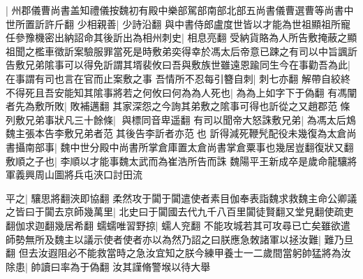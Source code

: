 |{
	州郡儀曹尚書盖知禮儀按魏初有殿中樂部駕部南部北部五尚書儀曹選曹等尚書中世所置訢許斤翻}
少相親善|{
	少詩沿翻}
與中書侍郎盧度世皆以才能為世祖顯祖所寵任參豫機密出納詔命其後訢出為相州刺史|{
	相息亮翻}
受納貨賂為人所告敷掩蔽之顯祖聞之檻車徵訢案驗服罪當死是時敷弟奕得幸於馮太后帝意已踈之有司以中旨諷訢告敷兄弟隂事可以得免訢謂其壻裴攸曰吾與敷族世雖遠恩踰同生今在事勸吾為此|{
	在事謂有司也言在官而止案敷之事}
吾情所不忍每引簪自刺|{
	刺七亦翻}
解帶自絞終不得死且吾安能知其隂事將若之何攸曰何為為人死也|{
	為為上如字下于偽翻}
有馮闡者先為敷所敗|{
	敗補邁翻}
其家深怨之今詢其弟敷之隂事可得也訢從之又趙郡范條列敷兄弟事狀凡三十餘條|{
	與標同音卑遥翻}
有司以聞帝大怒誅敷兄弟|{
	為馮太后鴆魏主張本告李敷兄弟者范其後告李訢者亦范也}
訢得減死鞭髠配役未幾復為太倉尚書攝南部事|{
	魏中世分殿中尚書所掌倉庫置太倉尚書掌倉粟事也幾居豈翻復狀又翻}
敷順之子也|{
	李順以才能事魏太武而為崔浩所告而誅}
魏陽平王新成卒是歲命龍驤將軍義興周山圖將兵屯浹口討田流

平之|{
	驤思將翻浹即協翻}
柔然攻于闐于闐遣使者素目伽奉表詣魏求救魏主命公卿議之皆曰于闐去京師幾萬里|{
	北史曰于闐國去代九千八百里闐徒賢翻又堂見翻使疏吏翻伽求迦翻幾居希翻}
蠕蠕唯習野掠|{
	蠕人兖翻}
不能攻城若其可攻尋已亡矣雖欲遣師勢無所及魏主以議示使者使者亦以為然乃詔之曰朕應急敇諸軍以拯汝難|{
	難乃旦翻}
但去汝遐阻必不能救當時之急汝宜知之朕今練甲養士一二歲間當躬帥猛將為汝除患|{
	帥讀曰率為于偽翻}
汝其謹脩警堠以待大舉

